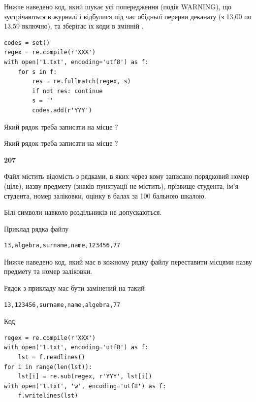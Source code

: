 Нижче наведено код, який шукає усі попередження (подія WARNING), що зустрі\-ча\-ються в журналі і відбулися під час обідньої перерви деканату (з 13,00 по 13,59 включно), та зберігає їх коди в змінній .



\begin{verbatim}
codes = set()
regex = re.compile(r'XXX')
with open('1.txt', encoding='utf8') as f:
    for s in f:
        res = re.fullmatch(regex, s)
        if not res: continue
        s = ''
        codes.add(r'YYY')
\end{verbatim}







Який рядок треба записати на місце  ?\par
\vspace{5mm}


Який рядок треба записати на місце  ?\par


\newpage

{\begin {center}\textbf{ 207}\end {center}}\par
Файл  містить відомість з рядками, в яких через кому записано поряд\-ковий номер (ціле), назву предмету (знаків пунктуації не містить), прізвище студента, ім'я студента, номер заліковки, оцінку в балах за 100 бальною шкалою.

Білі символи навколо роздільників не допускаються.

Приклад рядка файлу



\begin{verbatim}
13,algebra,surname,name,123456,77
\end{verbatim}


Нижче наведено код, який має в кожному рядку файлу переставити місцями назву предмету та номер заліковки.

Рядок з прикладу має бути замінений на такий



\begin{verbatim}
13,123456,surname,name,algebra,77
\end{verbatim}




Код



\begin{verbatim}
regex = re.compile(r'XXX')
with open('1.txt', encoding='utf8') as f:
    lst = f.readlines()
for i in range(len(lst)):
    lst[i] = re.sub(regex, r'YYY', lst[i])
with open('1.txt', 'w', encoding='utf8') as f:
    f.writelines(lst)
\end{verbatim}







